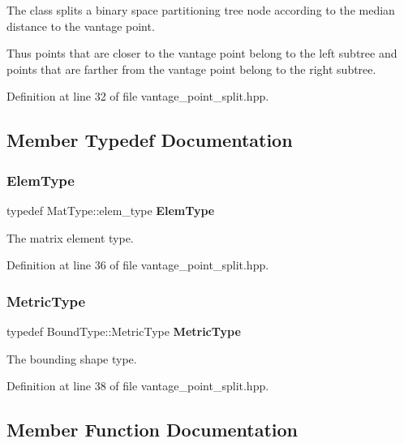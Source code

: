 The class splits a binary space partitioning tree node according to the median distance to the vantage point. 

Thus points that are closer to the vantage point belong to the left subtree and points that are farther from the vantage point belong to the right subtree. 

Definition at line 32 of file vantage\+\_\+point\+\_\+split.\+hpp.



\subsection{Member Typedef Documentation}
\mbox{\label{classmlpack_1_1tree_1_1VantagePointSplit_a227d0c7e23e98fcd6c81ecab357a791f}} 
\subsubsection{Elem\+Type}
{\footnotesize\ttfamily typedef Mat\+Type\+::elem\+\_\+type \textbf{ Elem\+Type}}



The matrix element type. 



Definition at line 36 of file vantage\+\_\+point\+\_\+split.\+hpp.

\mbox{\label{classmlpack_1_1tree_1_1VantagePointSplit_a79faa898201367f659c88a82cb694be9}} 
\subsubsection{Metric\+Type}
{\footnotesize\ttfamily typedef Bound\+Type\+::\+Metric\+Type \textbf{ Metric\+Type}}



The bounding shape type. 



Definition at line 38 of file vantage\+\_\+point\+\_\+split.\+hpp.



\subsection{Member Function Documentation}
\mbox{\label{classmlpack_1_1tree_1_1VantagePointSplit_af0fc61f469596cb8796d1966564ecbcb}} 
